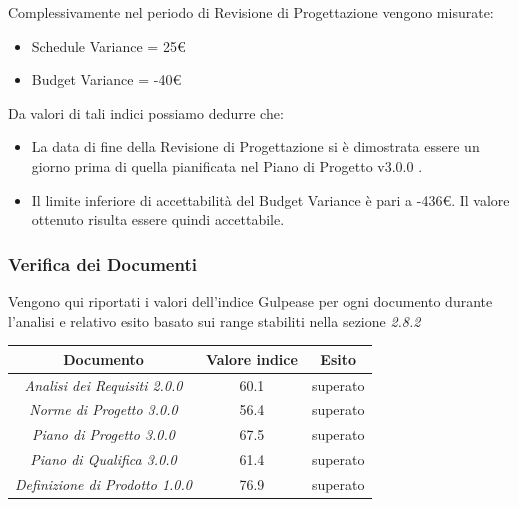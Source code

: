 {  Complessivamente nel periodo di Revisione di Progettazione vengono misurate:
  \begin{itemize}
  \item Schedule Variance = 25€
  \item Budget Variance = -40€
  \end{itemize}

  Da valori di tali indici possiamo dedurre che:
  \begin{itemize}
  \item La data di fine della Revisione di Progettazione si è dimostrata essere un
    giorno prima di quella pianificata nel Piano di Progetto v3.0.0 .
  \item  Il limite inferiore di accettabilità del Budget Variance è pari a -436€.
    Il valore ottenuto risulta essere quindi accettabile. 
  \end{itemize}


  \subsubsection{Verifica dei Documenti}
  Vengono qui riportati i valori dell'indice Gulpease per ogni documento durante l’analisi e relativo
  esito basato sui range stabiliti nella sezione \emph{2.8.2}
  \begin{center}
    \begin{tabular}{|c|c|c|}
      \hline
      \textbf{Documento} & \textbf{Valore indice} & \textbf{Esito} \\
      \hline
      \emph{Analisi dei Requisiti 2.0.0}  & 60.1 & superato \\
      \hline
      \emph{Norme di Progetto 3.0.0}   & 56.4  & superato \\
      \hline
      \emph{Piano di Progetto 3.0.0}   & 67.5 & superato \\
      \hline
      \emph{Piano di Qualifica 3.0.0}   & 61.4 & superato \\
      \hline
      \emph{Definizione di Prodotto 1.0.0}  & 76.9 & superato \\
      \hline
    \end{tabular}
  \end{center}
  
}
